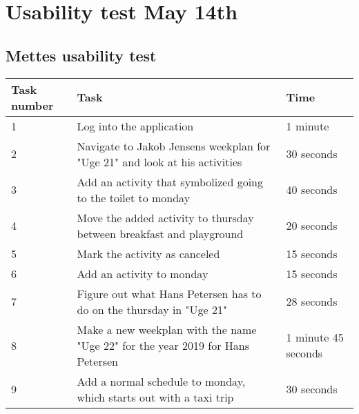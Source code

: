\newpage
\chapter{Usability test May 14th}\label{usability-test-14-05}
\section{Mettes usability test}\label{usability-test-14-05-mette}
\begin{table}[H]
    \small
    \begin{tabular}{|p{1.3cm}|p{10cm}|p{1.7cm}|}
    \hline
    Task number  &Task                                                                                                                & Time      \\ \hline
    1 & Log into the application                                                                                                               & 1 minute  \\ \hline
    2 & Navigate to Jakob Jensens weekplan for "Uge 21" and look at his activities                                                     & 30 seconds  \\ \hline
    3 & Add an activity that symbolized going to the toilet to monday                                                                & 40 seconds               \\ \hline
    4 & Move the added activity to thursday between breakfast and playground                                                          & 20 seconds   \\ \hline
    5 & Mark the activity as canceled                                                                                                & 15 seconds     \\ \hline
    6 & Add an activity to monday                                                                                                     & 15 seconds     \\ \hline
    7 & Figure out what Hans Petersen has to do on the thursday in "Uge 21"                                                       & 28 seconds           \\ \hline
    8 & Make a new weekplan with the name "Uge 22" for the year 2019 for Hans Petersen                                                 & 1 minute 45 seconds        \\ \hline
    9 & Add a normal schedule to monday, which starts out with a taxi trip                                                     & 30 seconds                                                  \\ \hline

\end{tabular}
\end{table}

